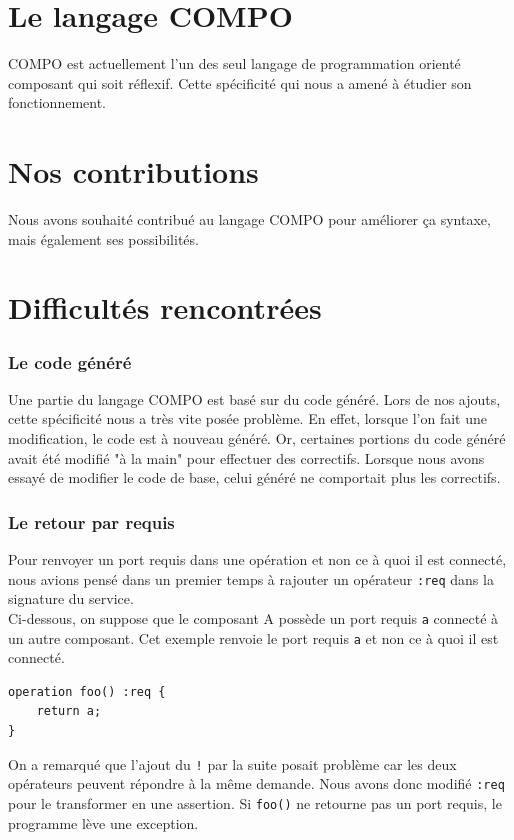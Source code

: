 \documentclass[11pt,a4paper,openany,oneside]{book}
\begin{document}
\section{Le langage COMPO}

COMPO est actuellement l'un des seul langage de programmation orienté composant qui soit réflexif. Cette spécificité qui nous a amené à étudier son fonctionnement.


\section{Nos contributions}

Nous avons souhaité contribué au langage COMPO pour améliorer ça syntaxe, mais également ses possibilités.

\section{Difficultés rencontrées}

\subsubsection{Le code généré}

Une partie du langage COMPO est basé sur du code généré. Lors de nos ajouts, cette spécificité nous a très vite posée problème. En effet, lorsque l'on fait une modification, le code est à nouveau généré. Or, certaines portions du code généré avait été modifié "à la main" pour effectuer des correctifs. Lorsque nous avons essayé de modifier le code de base, celui généré ne comportait plus les correctifs.

\subsubsection{Le retour par requis}
Pour renvoyer un port requis dans une opération et non ce à quoi il est connecté, nous avions pensé dans un premier temps à rajouter un opérateur \texttt{:req} dans la signature du service.\\
Ci-dessous, on suppose que le composant A possède un port requis \texttt{a} connecté à un autre composant. Cet exemple renvoie le port requis \texttt{a} et non ce à quoi il est connecté.
\begin{lstlisting}[language=COMPO, frame=single, caption=Syntaxe d'une opération avec \texttt{:req} en COMPO]
operation foo() :req {
    return a;
}
\end{lstlisting}
On a remarqué que l'ajout du \texttt{!} par la suite posait problème car les deux opérateurs peuvent répondre à la même demande. Nous avons donc modifié \texttt{:req} pour le transformer en une assertion. Si \texttt{foo()} ne retourne pas un port requis, le programme lève une exception.
\end{document}

